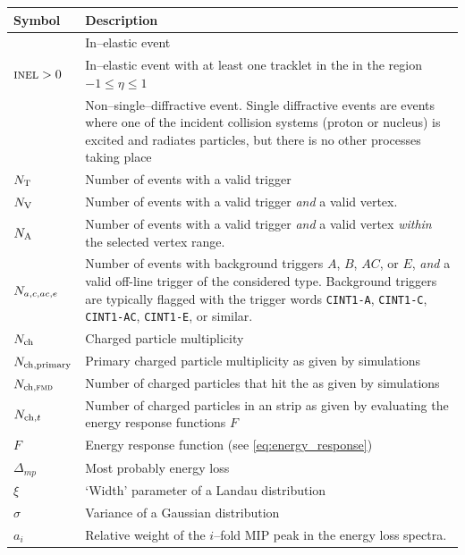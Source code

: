 \documentclass[11pt]{article}
\def\AlwaysText#1{\ifmmode\relax\text{#1}\else #1\fi}
\newcommand{\AbbrName}[1]{\AlwaysText{{\scshape #1}}}
\newcommand{\SPD}{\AbbrName{spd}}
\newcommand{\INEL}{\AbbrName{inel}}
\newcommand{\INELONE}{$\AbbrName{inel}>0$}
\newcommand{\NSD}{\AbbrName{nsd}}
\newcommand{\FMD}[1][]{\AbbrName{fmd\ifx|#1|\else#1\fi}}
\newcommand{\mult}[1][]{\ensuremath N_{\text{ch}#1}}
\newcommand{\N}[2]{{\ensuremath N_{#1#2}}}
\newcommand{\NV}[1][]{\N{\text{V}}{#1}}
\newcommand{\NT}{\N{\text{T}}{}}
\newcommand{\NA}{\N{\text{A}}{}}
\begin{document}
\begin{table}[hbp]
  \centering
  \begin{tabular}[t]{|lp{}|}
    \hline 
    \textbf{Symbol}&\textbf{Description}\\
    \hline 
    \INEL & In--elastic event\\ 
    \INELONE & In--elastic event with at least one tracklet in the
    \SPD{} in the region $-1\le\eta\le1$\\ 
    \NSD{} & Non--single--diffractive event.  Single diffractive
    events are events where one of the incident collision systems
    (proton or nucleus) is excited and radiates particles, but there
    is no other processes taking place\\ 
    \hline
    $\NT{}$ & Number of events with a valid trigger\\
    $\NV{}$ & Number of events with a valid trigger \emph{and} a valid
    vertex.\\  
    $\NA{}$ & Number of events with a valid trigger
    \emph{and} a valid vertex \emph{within} the selected vertex range.\\ 
    $\N{a,c,ac,e}{}$ & Number of events with background triggers $A$,
    $B$, $AC$, or $E$, \emph{and} a valid off-line trigger of the
    considered type.   Background triggers are typically flagged with
    the trigger words \texttt{CINT1-A},  \texttt{CINT1-C},
    \texttt{CINT1-AC}, \texttt{CINT1-E}, or similar.\\
    \hline
    $\mult{}$ & Charged particle multiplicity\\ 
    $\mult[,\text{primary}]$ & Primary charged particle multiplicity
    as given by simulations\\ 
    $\mult[,\text{\FMD{}}]$ & Number of charged particles that hit the
    \FMD{} as given by simulations\\ 
    $\mult[,t]$ & Number of charged particles in an \FMD{} strip as
    given by evaluating the energy response functions $F$\\ 
    \hline
    $F$ & Energy response function (see \eqref{eq:energy_response})\\
    $\Delta_{mp}$ & Most probably energy loss\\ 
    $\xi$ & `Width' parameter of a Landau distribution\\
    $\sigma$ & Variance of a Gaussian distribution\\ 
    $a_i$ & Relative weight of the $i$--fold MIP peak in the energy
    loss spectra.\\ 

\end{tabular}
\end{table}
\end{document}
